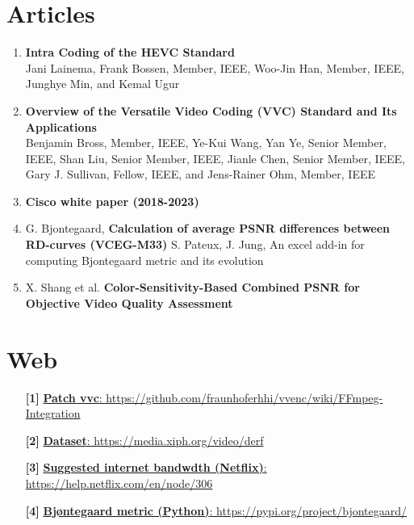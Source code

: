 \section{Articles}
\begin{enumerate}
    \item \textbf{Intra Coding of the HEVC Standard}\\
    Jani Lainema, Frank Bossen, Member, IEEE, Woo-Jin Han, Member, IEEE, Junghye Min, and Kemal Ugur
    \item \textbf{Overview of the Versatile Video Coding (VVC) Standard and Its Applications}\\
    Benjamin Bross, Member, IEEE, Ye-Kui Wang, Yan Ye, Senior Member, IEEE, Shan Liu, Senior Member, IEEE, Jianle Chen, Senior Member, IEEE, Gary J. Sullivan, Fellow, IEEE, and Jens-Rainer Ohm, Member, IEEE
    \item \textbf{Cisco white paper (2018-2023)}
    \item G. Bjontegaard, \textbf{Calculation of average PSNR differences between RD-curves (VCEG-M33)} S. Pateux, J. Jung, An excel add-in for computing Bjontegaard metric and its evolution
    \item X. Shang et al. \textbf{Color-Sensitivity-Based Combined PSNR for Objective Video Quality Assessment}
\end{enumerate}

\section{Web}
\begin{enumerate}
    \item[\textbf{[1]}]\href{https://github.com/fraunhoferhhi/vvenc/wiki/FFmpeg-Integration}{\textbf{Patch vvc}: https://github.com/fraunhoferhhi/vvenc/wiki/FFmpeg-Integration}
    \item[\textbf{[2]}]\href{https://media.xiph.org/video/derf/}{\textbf{Dataset}: https://media.xiph.org/video/derf}
    \item[\textbf{[3]}]\href{https://help.netflix.com/en/node/306}{\textbf{Suggested internet bandwdth (Netflix)}: https://help.netflix.com/en/node/306}
    \item[\textbf{[4]}]\href{https://pypi.org/project/bjontegaard/}{\textbf{Bj\o ntegaard metric (Python)}: https://pypi.org/project/bjontegaard/}
\end{enumerate}
